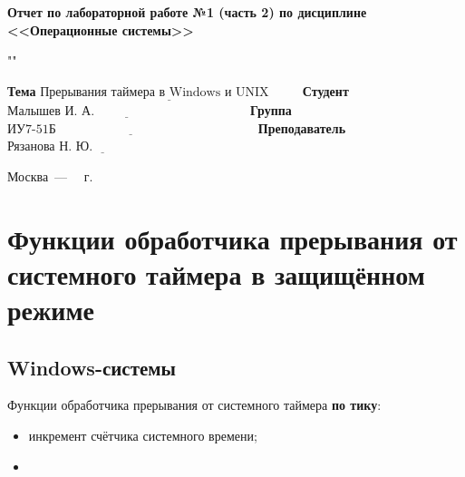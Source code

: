 \documentclass[a4paper,12pt]{extreport}
\begin{document}
\begin{center}
	\Large\textbf{Отчет по лабораторной работе №1 (часть 2) по дисциплине <<Операционные системы>>}
\end{center}

""\newline\newline

\noindent\textbf{Тема} $\underline{\text{Прерывания таймера в Windows и UNIX~~~~~~~}}$\newline\newline
\noindent\textbf{Студент} $\underline{\text{Малышев И. А.~~~~~~~~~~~~~~~~~~~~~~~~~~~~~~~~~~~~}}$\newline\newline
\noindent\textbf{Группа} $\underline{\text{ИУ7-51Б~~~~~~~~~~~~~~~~~~~~~~~~~~~~~~~~~~~~~~~~~~~~~~~}}$\newline\newline
\noindent\textbf{Преподаватель} $\underline{\text{Рязанова Н. Ю.~~~~~~~~~~~~~~~~~~~~~~~~~}}$\newline

\begin{center}
	\vfill
	Москва~---~\the\year
	~г.
\end{center}
\restoregeometry

\newpage

\chapter{Функции обработчика прерывания от системного таймера в защищённом режиме}

\section{Windows-системы}

Функции обработчика прерывания от системного таймера \textbf{по тику}:
\begin{itemize}
	\item инкремент счётчика системного времени;
	\item 
\end{itemize}
\end{document}
